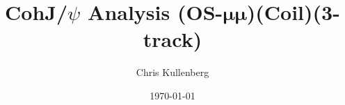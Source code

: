 \title{CohJ/$\psi$ Analysis (\textbf{OS}-$\boldsymbol{\mu\mu}$)(\textbf{Coil})(\textbf{3-track})}
\author{Chris Kullenberg}
\date{\today}
